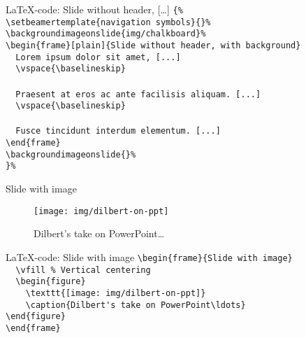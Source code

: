 \toggleslidecolors
\begin{frame}[fragile]{\LaTeX-code: Slide without header, [\ldots]}
\footnotesize
\verb|{%|\\
\verb|\setbeamertemplate{navigation symbols}{}%|\\
\verb|\backgroundimageonslide{img/chalkboard}%|\\
\verb|\begin{frame}[plain]{Slide without header, with background}|\\
\verb|  Lorem ipsum dolor sit amet, [...]|\\
\verb|  \vspace{\baselineskip}|\\
\verb||\\
\verb|  Praesent at eros ac ante facilisis aliquam. [...]|\\
\verb|  \vspace{\baselineskip}|\\
\verb||\\
\verb|  Fusce tincidunt interdum elementum. [...]|\\
\verb|\end{frame}|\\
\verb|\backgroundimageonslide{}%|\\
\verb|}%|\\
\end{frame}
\toggleslidecolors

\begin{frame}{Slide with image}
\vfill %
\begin{figure}
\texttt{[image: img/dilbert-on-ppt]}
\caption{Dilbert's take on PowerPoint\ldots}
\end{figure}
\end{frame}

\toggleslidecolors
\begin{frame}[fragile]{\LaTeX-code: Slide with image}
\footnotesize
\verb|\begin{frame}{Slide with image}|\\
\verb|  \vfill % Vertical centering|\\
\verb|  \begin{figure}|\\
\verb|    \texttt{[image: img/dilbert-on-ppt]}|\\
\verb|    \caption{Dilbert's take on PowerPoint\ldots}|\\
\verb|\end{figure}|\\
\verb|\end{frame}|\\
\end{frame}
\toggleslidecolors

